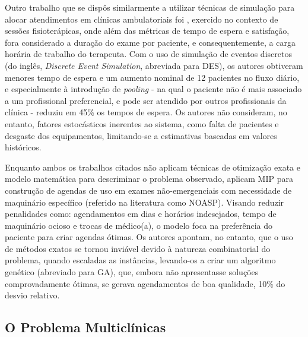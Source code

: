 Outro trabalho que se dispôs similarmente a utilizar técnicas de simulação para alocar atendimentos em clínicas ambulatoriais foi , exercido no contexto de sessões fisioterápicas, onde além das métricas de tempo de espera e satisfação, fora considerado a duração do exame por paciente, e consequentemente, a carga horária de trabalho do terapeuta. Com o uso de simulação de eventos discretos (do inglês, \textit{Discrete Event Simulation}, abreviada para DES), os autores obtiveram menores tempo de espera e um aumento nominal de 12 pacientes no fluxo diário, e especialmente à introdução de \textit{pooling} - na qual o paciente não é mais associado a um profissional preferencial, e pode ser atendido por outros profissionais da clínica - reduziu em 45\% os tempos de espera. Os autores  não consideram, no entanto, fatores estocásticos inerentes ao sistema, como falta de pacientes e desgaste dos equipamentos, limitando-se a estimativas baseadas em valores históricos.

Enquanto ambos os trabalhos citados não aplicam técnicas de otimização exata e modelo matemática para descriminar o problema observado,  aplicam MIP para construção de agendas de uso em exames não-emergenciais com necessidade de maquinário específico (referido na literatura como NOASP). Visando reduzir penalidades como: agendamentos em dias e horários indesejados, tempo de maquinário ocioso e trocas de médico(a), o modelo foca na preferência do paciente para criar agendas ótimas. Os autores apontam, no entanto, que o uso de métodos exatos se tornou inviável devido à natureza combinatorial do problema, quando escaladas as instâncias, levando-os a criar um algoritmo genético (abreviado para GA), que, embora não apresentasse soluções comprovadamente ótimas, se gerava agendamentos de boa qualidade, 10\% do desvio relativo.

\subsection{O Problema Multiclínicas}
\label{2rev-sec2-sub1}

